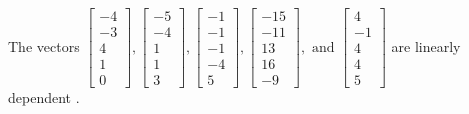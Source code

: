 \begin{exercise}
\begin{exerciseStatement}
  \end{exerciseStatement}
  \begin{exerciseAnswer}
   The vectors \(\left[\begin{array}{r}
-4 \\
-3 \\
4 \\
1 \\
0
\end{array}\right] , \left[\begin{array}{r}
-5 \\
-4 \\
1 \\
1 \\
3
\end{array}\right] , \left[\begin{array}{r}
-1 \\
-1 \\
-1 \\
-4 \\
5
\end{array}\right] , \left[\begin{array}{r}
-15 \\
-11 \\
13 \\
16 \\
-9
\end{array}\right] , \text{ and } \left[\begin{array}{r}
4 \\
-1 \\
4 \\
4 \\
5
\end{array}\right]\) are 
  	 linearly dependent  .
  


  \end{exerciseAnswer}
\end{exercise}